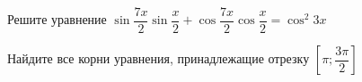 \begin{ex}
	\begin{condition}
		\begin{enumcols}[label=\asbuk*)]
			\item Решите уравнение \(  \sin {\dfrac{7x}{2}}\sin {\dfrac{x}{2}}+\cos {\dfrac{7x}{2}}\cos {\dfrac{x}{2}} = \cos^2 3x \)
			\item Найдите все корни уравнения, принадлежащие отрезку \( \left[\pi;\dfrac{3\pi}{2}\right] \)
		\end{enumcols}
	\end{condition}
\end{ex}